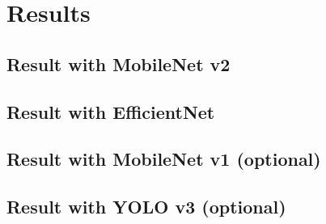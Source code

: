 \chapter{Results}\label{ch:results}
\lipsum[1]

\section{Result with MobileNet v2}
\lipsum[1]

\section{Result with EfficientNet}
\lipsum[1]

\section{Result with MobileNet v1 (optional)}
\lipsum[1]

\section{Result with YOLO v3 (optional)}
\lipsum[1]
